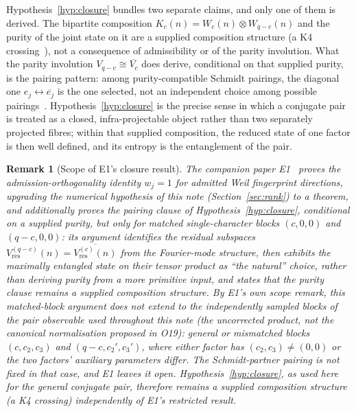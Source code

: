 \documentclass[11pt]{article}
\newtheorem{remark}{Remark}
\begin{document}
    Hypothesis~\ref{hyp:closure} bundles two separate claims, and only one of them is derived.
    The bipartite composition $K_c(n) = W_c(n) \otimes W_{q-c}(n)$ and the purity of the joint state on it
    are a supplied composition structure (a K4 crossing~\cite{Beau2026esub}), not a consequence of
    admissibility or of the parity involution.
    What the parity involution $V_{q-c}\cong\overline{V_c}$ does derive, conditional on that supplied
    purity, is the pairing pattern: among purity-compatible Schmidt pairings, the diagonal one
    $e_j\leftrightarrow\overline{e_j}$ is the one selected, not an independent choice among possible
    pairings~\cite{Beau2026a34,Beau2026a21}.
    Hypothesis~\ref{hyp:closure} is the precise sense in which a conjugate pair is treated as a closed,
    infra-projectable object rather than two separately projected fibres; within that supplied
    composition, the reduced state of one factor is then well defined, and its entropy is the
    entanglement of the pair.

    \begin{remark}[Scope of E1's closure result]
      \label{rem:e1-scope}
      The companion paper E1~\cite{Beau2026ent1} proves the admission-orthogonality identity $w_j=1$ for
      admitted Weil fingerprint directions, upgrading the numerical hypothesis of this note
      (Section~\ref{sec:rank}) to a theorem, and additionally proves the pairing clause of
      Hypothesis~\ref{hyp:closure}, conditional on a supplied purity, but only for matched single-character
      blocks $(c,0,0)$ and $(q-c,0,0)$: its argument
      identifies the residual subspaces $V^{(q-c)}_{\mathrm{res}}(n)=\overline{V^{(c)}_{\mathrm{res}}(n)}$
      from the Fourier-mode structure, then exhibits the maximally entangled state on their tensor
      product as ``the natural'' choice, rather than deriving purity from a more primitive input, and states
      that the purity clause remains a supplied composition structure.
      By E1's own scope remark, this matched-block argument does not extend to the independently
      sampled blocks of the pair observable used throughout this note (the uncorrected product, not the
      canonical normalisation proposed in O19): general or mismatched
      blocks $(c,c_2,c_3)$ and $(q-c,c_2',c_3')$, where either factor has $(c_2,c_3)\neq(0,0)$ or the two
      factors' auxiliary parameters differ.
      The Schmidt-partner pairing is not fixed in that case, and E1 leaves it open.
      Hypothesis~\ref{hyp:closure}, as used here for the general conjugate pair, therefore remains a
      supplied composition structure (a K4 crossing) independently of E1's restricted result.
    \end{remark}
\end{document}
